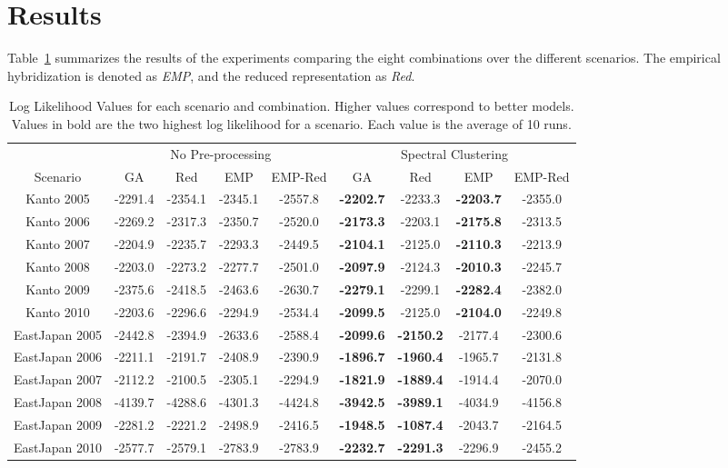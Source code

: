 \section{Results}
\label{sec:results}

Table~\ref{tab:loglikelihood} summarizes the results of the
experiments comparing the eight combinations over the different
scenarios. The empirical hybridization is denoted as \emph{EMP}, and
the reduced representation as \emph{Red}.

\begin{table}
  \caption{Log Likelihood Values for each scenario and
    combination. Higher values correspond to better models. Values in
    bold are the two highest log likelihood for a scenario. Each value
    is the average of 10 runs.}
  \label{tab:loglikelihood}
  \begin{tabular}{|c|c|c|c|c|c|c|c|c|}
    \hline
    & \multicolumn{4}{|c|}{No Pre-processing} & \multicolumn{4}{|c|}{Spectral Clustering}\\
    Scenario & GA & Red & EMP & EMP-Red & GA & Red & EMP & EMP-Red\\
    \hline
    Kanto 2005 & -2291.4 & -2354.1 & -2345.1 & -2557.8 & {\bf-2202.7} & -2233.3 & {\bf-2203.7} & -2355.0\\
    Kanto 2006 & -2269.2 & -2317.3 & -2350.7 & -2520.0 & {\bf-2173.3} & -2203.1 & {\bf-2175.8} & -2313.5\\
    Kanto 2007 & -2204.9 & -2235.7 & -2293.3 & -2449.5 & {\bf-2104.1} & -2125.0 & {\bf-2110.3} & -2213.9\\
    Kanto 2008 & -2203.0 & -2273.2 & -2277.7 & -2501.0 & {\bf-2097.9} & -2124.3 & {\bf-2010.3} & -2245.7\\
    Kanto 2009 & -2375.6 & -2418.5 & -2463.6 & -2630.7 & {\bf-2279.1} & -2299.1 & {\bf-2282.4} & -2382.0\\
    Kanto 2010 & -2203.6 & -2296.6 & -2294.9 & -2534.4 & {\bf-2099.5} & -2125.0 & {\bf-2104.0} & -2249.8\\
    \hline
    EastJapan 2005 &-2442.8&-2394.9&-2633.6&-2588.4& {\bf-2099.6} & {\bf-2150.2} & -2177.4 & -2300.6 \\
    EastJapan 2006 &-2211.1&-2191.7&-2408.9&-2390.9&{\bf-1896.7}&{\bf-1960.4}&-1965.7&-2131.8\\
    EastJapan 2007 &-2112.2&-2100.5&-2305.1&-2294.9&{\bf-1821.9}&{\bf-1889.4}&-1914.4&-2070.0\\
    EastJapan 2008 &-4139.7&-4288.6&-4301.3&-4424.8&{\bf-3942.5}&{\bf-3989.1}&-4034.9&-4156.8\\
    EastJapan 2009 &-2281.2&-2221.2&-2498.9&-2416.5&{\bf-1948.5}&{\bf-1087.4}&-2043.7&-2164.5\\
    EastJapan 2010 &-2577.7&-2579.1&-2783.9&-2783.9&{\bf-2232.7}&{\bf-2291.3}&-2296.9&-2455.2\\
    \hline
  \end{tabular}
\end{table}

